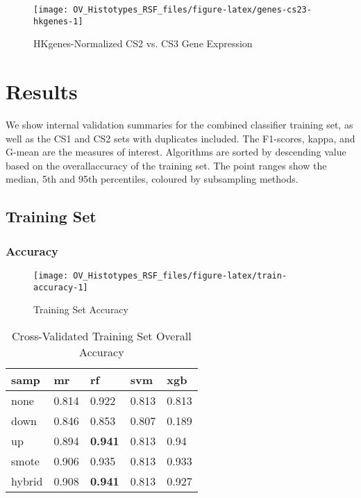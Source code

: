 \documentclass[
]{report}
\begin{document}
\begin{figure}[H]

{\centering \texttt{[image: OV\_Histotypes\_RSF\_files/figure-latex/genes-cs23-hkgenes-1]} 

}

\caption{HKgenes-Normalized CS2 vs. CS3 Gene Expression}\label{fig:genes-cs23-hkgenes}
\end{figure}

\hypertarget{results}{%
\chapter{Results}\label{results}}

We show internal validation summaries for the combined classifier training set, as well as the CS1 and CS2 sets with duplicates included. The F1-scores, kappa, and G-mean are the measures of interest. Algorithms are sorted by descending value based on the overallaccuracy of the training set. The point ranges show the median, 5th and 95th percentiles, coloured by subsampling methods.

\hypertarget{training-set}{%
\section{Training Set}\label{training-set}}

\hypertarget{accuracy}{%
\subsection{Accuracy}\label{accuracy}}

\begin{figure}[H]

{\centering \texttt{[image: OV\_Histotypes\_RSF\_files/figure-latex/train-accuracy-1]} 

}

\caption{Training Set Accuracy}\label{fig:train-accuracy}
\end{figure}

\begin{table}

\caption{\label{tab:train-accuracy-table}Cross-Validated Training Set Overall Accuracy}
\centering
\begin{tabular}[t]{l|l|l|l|l}
\hline
samp & mr & rf & svm & xgb\\
\hline
none & 0.814 & 0.922 & 0.813 & 0.813\\
\hline
down & 0.846 & 0.853 & 0.807 & 0.189\\
\hline
up & 0.894 & \textbf{0.941} & 0.813 & 0.94\\
\hline
smote & 0.906 & 0.935 & 0.813 & 0.933\\
\hline
hybrid & 0.908 & \textbf{0.941} & 0.813 & 0.927\\
\hline
\end{tabular}
\end{table}
\end{document}
